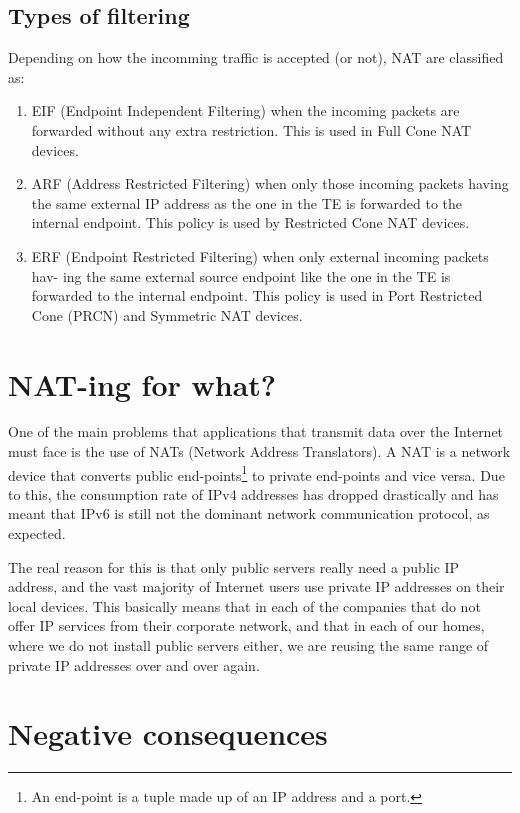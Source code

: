 \begin{enumrate}
\subsection{Types of filtering}

Depending on how the incomming traffic is accepted (or not), NAT are
classified as:

\begin{enumerate}
\item EIF (Endpoint Independent Filtering) when the incoming packets
  are forwarded without any extra restriction. This is used in Full
  Cone NAT devices.
\item ARF (Address Restricted Filtering) when only those incoming
  packets having the same external IP address as the one in the TE is
  forwarded to the internal endpoint. This policy is used by
  Restricted Cone NAT devices.
\item ERF (Endpoint Restricted Filtering) when only external incoming
  packets hav- ing the same external source endpoint like the one in
  the TE is forwarded to the internal endpoint. This policy is used in
  Port Restricted Cone (PRCN) and Symmetric NAT devices.
\end{enumerate}
  
\section{NAT-ing for what?}

One of the main problems that applications that transmit data over the
Internet must face is the use of NATs (Network Address Translators). A
NAT is a network device that converts public end-points\footnote{An
end-point is a tuple made up of an IP address and a port.} to private
end-points and vice versa. Due to this, the consumption rate of IPv4
addresses has dropped drastically and has meant that IPv6 is still not
the dominant network communication protocol, as expected.

The real reason for this is that only public servers really need a
public IP address, and the vast majority of Internet users use private
IP addresses on their local devices. This basically means that in each
of the companies that do not offer IP services from their corporate
network, and that in each of our homes, where we do not install public
servers either, we are reusing the same range of private IP addresses
over and over again.

\section{Negative consequences}


\end{enumrate}
